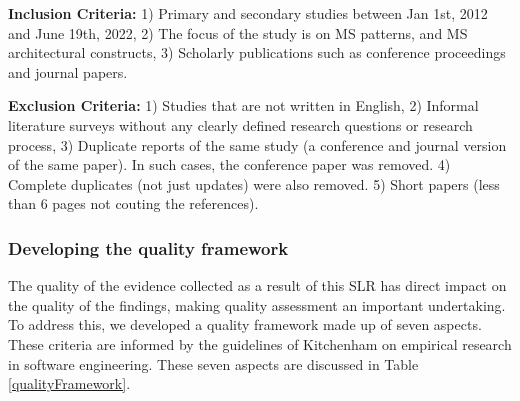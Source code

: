 \documentclass{bmcart}
\begin{document}
\textbf{Inclusion Criteria:} 1) Primary and secondary studies between Jan 1st, 2012 and June 19th, 2022, 2) The focus of the study is on MS patterns, and MS architectural constructs, 3) Scholarly publications such as conference proceedings and journal papers.

\textbf{Exclusion Criteria:} 1) Studies that are not written in English, 2) Informal literature surveys without any clearly defined research questions or research process, 3) Duplicate reports of the same study (a conference and journal version of the same paper). In such cases, the conference paper was removed. 4) Complete duplicates (not just updates) were also removed. 5) Short papers (less than 6 pages not couting the references).

\subsubsection{Developing the quality framework}

The quality of the evidence collected as a result of this SLR has direct impact on the quality of the findings, making quality assessment an important undertaking. To address this, we developed a quality framework made up of seven aspects. These criteria are informed by the guidelines of Kitchenham \cite{Kitchenham.2004} on empirical research in software engineering. These seven aspects are discussed in Table \ref{qualityFramework}.
\end{document}
